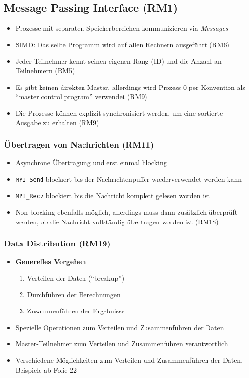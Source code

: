\subsection{Message Passing Interface (RM1)}
\begin{itemize}
	\item Prozesse mit separaten Speicherbereichen kommunizieren via \textit{Messages}
	\item SIMD: Das selbe Programm wird auf allen Rechnern ausgeführt (RM6)
	\item Jeder Teilnehmer kennt seinen eigenen Rang (ID) und die Anzahl an Teilnehmern (RM5)
	\item Es gibt keinen direkten Master, allerdings wird Prozess 0 per Konvention als "`master control program"' verwendet (RM9)
	\item Die Prozesse können explizit synchronisiert werden, um eine sortierte Ausgabe zu erhalten (RM9)
\end{itemize}

\subsubsection{Übertragen von Nachrichten (RM11)}
\begin{itemize}
	\item Asynchrone Übertragung und erst einmal blocking
	\item \texttt{MPI\_Send} blockiert bis der Nachrichtenpuffer wiederverwendet werden kann
	\item \texttt{MPI\_Recv} blockiert bis die Nachricht komplett gelesen worden ist
	\item Non-blocking ebenfalls möglich, allerdings muss dann zusätzlich überprüft werden, ob die Nachricht vollständig übertragen worden ist (RM18)
\end{itemize}

\subsubsection{Data Distribution (RM19)}
\begin{itemize}
	\item \textbf{Generelles Vorgehen}
	\begin{enumerate}
		\item Verteilen der Daten ("`breakup"')
		\item Durchführen der Berechnungen
		\item Zusammenführen der Ergebnisse
	\end{enumerate}
	\item Spezielle Operationen zum Verteilen und Zusammenführen der Daten
	\item Master-Teilnehmer zum Verteilen und Zusammenführen verantwortlich
	\item Verschiedene Möglichkeiten zum Verteilen und Zusammenführen der Daten. Beispiele ab Folie 22
\end{itemize}


